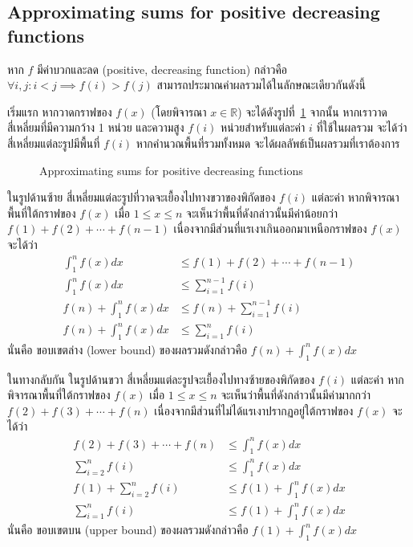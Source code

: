 \subsection{Approximating sums for positive decreasing functions}

หาก $f$ มีค่าบวกและลด (positive, decreasing function) กล่าวคือ $\forall i,j: i<j \implies f(i)>f(j)$ สามารถประมาณค่าผลรวมได้ในลักษณะเดียวกันดังนี้

เริ่มแรก หากวาดกราฟของ $f(x)$ (โดยพิจารณา $x\in\mathbb{R}$) จะได้ดังรูปที่~\ref{fig:sums-approx-pos-dec} \enskip จากนั้น หากเราวาดสี่เหลี่ยมที่มีความกว้าง 1 หน่วย และความสูง $f(i)$ หน่วยสำหรับแต่ละค่า $i$ ที่ใช้ในผลรวม จะได้ว่า สี่เหลี่ยมแต่ละรูปมีพื้นที่ $f(i)$ \enskip หากคำนวณพื้นที่รวมทั้งหมด จะได้ผลลัพธ์เป็นผลรวมที่เราต้องการ
%
\begin{figure}
\begin{center}
%
\end{center}
\caption{Approximating sums for positive decreasing functions}
\label{fig:sums-approx-pos-dec}
\end{figure}
%
ในรูปด้านซ้าย สี่เหลี่ยมแต่ละรูปที่วาดจะเยื้องไปทางขวาของพิกัดของ $f(i)$ แต่ละค่า \enskip หากพิจารณาพื้นที่ใต้กราฟของ $f(x)$ เมื่อ $1\leq x\leq n$ จะเห็นว่าพื้นที่ดังกล่าวนั้นมีค่าน้อยกว่า $f(1)+f(2)+\cdots+f(n-1)$ เนื่องจากมีส่วนที่แรเงาเกินออกมาเหนือกราฟของ $f(x)$ \enskip จะได้ว่า
\begin{align*}
\int_1^n{f(x)dx} &\leq f(1)+f(2)+\cdots+f(n-1) \\
\int_1^n{f(x)dx} &\leq \sum_{i=1}^{n-1}{f(i)} \\
f(n)+\int_1^n{f(x)dx} &\leq f(n)+\sum_{i=1}^{n-1}{f(i)} \\
f(n)+\int_1^n{f(x)dx} &\leq \sum_{i=1}^n{f(i)}
\end{align*}
นั่นคือ ขอบเขตล่าง (lower bound) ของผลรวมดังกล่าวคือ $f(n)+\int_1^n{f(x)dx}$

ในทางกลับกัน ในรูปด้านขวา สี่เหลี่ยมแต่ละรูปจะเยื้องไปทางซ้ายของพิกัดของ $f(i)$ แต่ละค่า \enskip หากพิจารณาพื้นที่ใต้กราฟของ $f(x)$ เมื่อ $1\leq x\leq n$ จะเห็นว่าพื้นที่ดังกล่าวนั้นมีค่ามากกว่า $f(2)+f(3)+\cdots+f(n)$ เนื่องจากมีส่วนที่ไม่ได้แรเงาปรากฏอยู่ใต้กราฟของ $f(x)$ \enskip จะได้ว่า
\begin{align*}
f(2)+f(3)+\cdots+f(n) &\leq \int_1^n{f(x)dx} \\
\sum_{i=2}^{n}{f(i)} &\leq \int_1^n{f(x)dx} \\
f(1)+\sum_{i=2}^{n}{f(i)} &\leq f(1)+\int_1^n{f(x)dx} \\
\sum_{i=1}^{n}{f(i)} &\leq f(1)+\int_1^n{f(x)dx}
\end{align*}
นั่นคือ ขอบเขตบน (upper bound) ของผลรวมดังกล่าวคือ $f(1)+\int_1^n{f(x)dx}$

